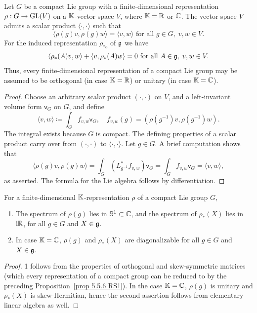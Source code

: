 \begin{prop}\label{prop 5.5.6 RS1}
    Let $G$ be a compact Lie group with a finite-dimensional representation $\rho:G\to \operatorname{GL}(V)$ on a $\mathbb{K}$-vector space $V$, where $\mathbb{K}=\mathbb{R}$ or $\mathbb{C}$. The vector space $V$ admits a scalar product $\langle\cdot,\cdot\rangle$ such that
    \[\langle\rho(g)v,\rho(g)w\rangle=\langle v,w\rangle\text{ for all }g\in G,\; v,w\in V.\]
    For the induced representation $\rho_{\ast e}$ of $\mathfrak{g}$ we have
    \[\langle \rho_{\ast}(A)v,w\rangle+\langle v,\rho_\ast (A) w\rangle=0\text{ for all }A\in\mathfrak{g},\;v,w\in V.\]
    Thus, every finite-dimensional representation of a compact Lie group may be assumed to be orthogonal (in case $\mathbb{K}=\mathbb{R}$) or unitary (in case $\mathbb{K}=\mathbb{C}$).
\end{prop}
\begin{proof}
    Choose an arbitrary scalar product $(\cdot,\cdot)$ on $V$, and a left-invariant volume form $\mathsf{v}_G$ on $G$, and define
    \[ \langle v,w\rangle \coloneqq\int_G f_{v,w}\mathsf{v}_G, \quad f_{v,w}(g)=\left(\rho(g^{-1})v,\rho(g^{-1})w\right).\]
    The integral exists because $G$ is compact. The defining properties of a scalar product carry over from $(\cdot,\cdot)$ to $\langle\cdot,\cdot\rangle$. Let $g\in G$. A brief computation shows that 
    \[\langle\rho(g)v,\rho(g)w\rangle=\int_G \left(L_{g^{-1}}^\ast f_{v,w}\right)\mathsf{v}_G =\int_G f_{v,w}\mathsf{v}_G=\langle v,w\rangle,\]
    as asserted. The formula for the Lie algebra follows by differentiation.
\end{proof}


\begin{cor}[{{\cite[Cor.~5.5.7]{RS1}}}]\label{cor 5.5.7 RS1}
    For a finite-dimensional $\mathbb{K}$-representation $\rho$ of a compact Lie group $G$,
    \begin{enumerate}
        \item The spectrum of $\rho(g)$ lies in $\mathbb{S}^1\subset \mathbb{C}$, and the spectrum of $\rho_\ast(X)$ lies in $\mathrm{i} \mathbb{R}$, for all $g\in G$ and $X\in\mathfrak{g}$.
        \item In case $\mathbb{K}=\mathbb{C}$, $\rho(g)$ and $\rho_\ast(X)$ are diagonalizable for all $g\in G$ and $X\in \mathfrak{g}$.
    \end{enumerate}
\end{cor}
\begin{proof}
    1 follows from the properties of orthogonal and skew-symmetric matrices (which every representation of a compact group can be reduced to by the preceding Proposition~\ref{prop 5.5.6 RS1}). In the case $\mathbb{K}=\mathbb{C}$, $\rho(g)$ is unitary and $\rho_\ast(X)$ is skew-Hermitian, hence the second assertion follows from elementary linear algebra as well.
\end{proof}







